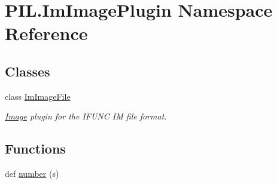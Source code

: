 \hypertarget{namespacePIL_1_1ImImagePlugin}{}\section{P\+I\+L.\+Im\+Image\+Plugin Namespace Reference}
\label{namespacePIL_1_1ImImagePlugin}
\subsection*{Classes}
\begin{DoxyCompactItemize}
\item 
class \hyperlink{classPIL_1_1ImImagePlugin_1_1ImImageFile}{Im\+Image\+File}
\begin{DoxyCompactList}\small\item\em \hyperlink{namespacePIL_1_1Image}{Image} plugin for the I\+F\+U\+NC IM file format. \end{DoxyCompactList}\end{DoxyCompactItemize}
\subsection*{Functions}
\begin{DoxyCompactItemize}
\item 
def \hyperlink{namespacePIL_1_1ImImagePlugin_a0a9d2b5e605aae6795d4cf7b169788f2}{number} (s)
\end{DoxyCompactItemize}
